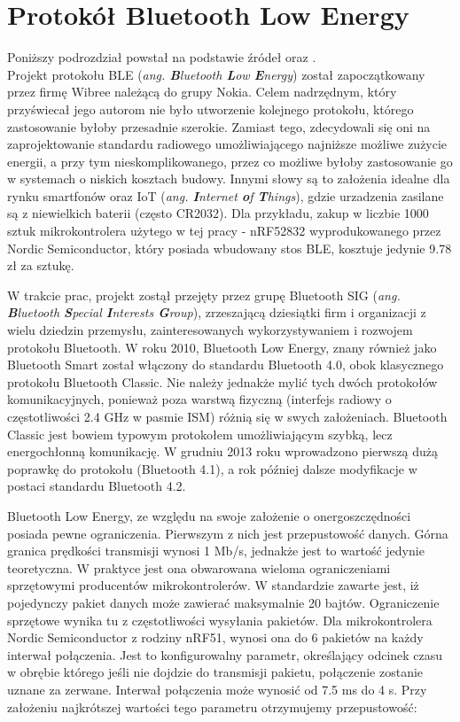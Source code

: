 \section{Protokół Bluetooth Low Energy}
\label{bluetooth}

Poniższy podrozdział powstał na podstawie źródeł \cite{BLE} oraz \cite{inzynierka}.\\

Projekt protokołu BLE (\textit{ang. \textbf{B}luetooth \textbf{L}ow \textbf{E}nergy}) został zapoczątkowany przez firmę Wibree należącą do grupy Nokia. Celem nadrzędnym, który przyświecał jego autorom nie było utworzenie kolejnego protokołu, którego zastosowanie byłoby przesadnie szerokie. Zamiast tego, zdecydowali się oni na zaprojektowanie standardu radiowego umożliwiającego najniższe możliwe zużycie energii, a przy tym nieskomplikowanego, przez co możliwe byłoby zastosowanie go w systemach o niskich kosztach budowy. Innymi słowy są to założenia idealne dla rynku smartfonów oraz IoT (\textit{ang. \textbf{I}nternet \textbf{o}f \textbf{T}hings}), gdzie urzadzenia zasilane są z niewielkich baterii (często CR2032). Dla przykładu, zakup w liczbie 1000 sztuk mikrokontrolera użytego w tej pracy - nRF52832 wyprodukowanego przez Nordic Semiconductor, który posiada wbudowany stos BLE, kosztuje jedynie 9.78 zł za sztukę.

W trakcie prac, projekt zostął przejęty przez grupę Bluetooth SIG (\textit{ang. \textbf{B}luetooth \textbf{S}pecial \textbf{I}nterests \textbf{G}roup}), zrzeszającą dziesiątki firm i organizacji z wielu dziedzin przemysłu, zainteresowanych wykorzystywaniem i rozwojem protokołu Bluetooth. W roku 2010, Bluetooth Low Energy, znany również jako Bluetooth Smart został włączony do standardu Bluetooth 4.0, obok klasycznego protokołu Bluetooth Classic. Nie należy jednakże mylić tych dwóch protokołów komunikacyjnych, ponieważ poza warstwą fizyczną (interfejs radiowy o częstotliwości 2.4 GHz w pasmie ISM) różnią się w swych założeniach. Bluetooth Classic jest bowiem typowym protokołem umożliwiającym szybką, lecz energochłonną komunikację. W grudniu 2013 roku wprowadzono pierwszą dużą poprawkę do protokołu (Bluetooth 4.1), a rok później dalsze modyfikacje w postaci standardu Bluetooth 4.2. 

Bluetooth Low Energy, ze względu na swoje założenie o onergoszczędności posiada pewne ograniczenia. Pierwszym z nich jest przepustowość danych. Górna granica prędkości transmisji wynosi 1 Mb/s, jednakże jest to wartość jedynie teoretyczna. W praktyce jest ona obwarowana wieloma ograniczeniami sprzętowymi producentów mikrokontrolerów. W standardzie zawarte jest, iż pojedynczy pakiet danych może zawierać maksymalnie 20 bajtów. Ograniczenie sprzętowe wynika tu z częstotliwości wysyłania pakietów. Dla  mikrokontrolera Nordic Semiconductor z rodziny nRF51, wynosi ona do 6 pakietów na każdy interwał połączenia. Jest to konfigurowalny parametr, określający odcinek czasu w obrębie którego jeśli nie dojdzie do transmisji pakietu, połączenie zostanie uznane za zerwane. Interwał połączenia może wynosić od 7.5 ms do 4 s. Przy założeniu najkrótszej wartości tego parametru otrzymujemy przepustowość:

